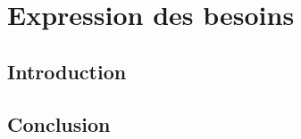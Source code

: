 \chapter{Expression des besoins}
\clearpage
\label{chap:besoins}

\section{Introduction}


\section{Conclusion}





